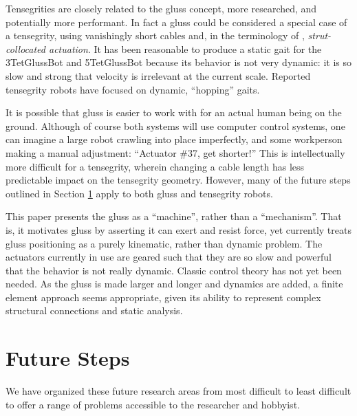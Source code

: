 \documentclass[11pt]{article}
\begin{document}
Tensegrities are closely related to the gluss concept, more researched, and potentially more performant.
In fact a gluss could be considered a special case of a tensegrity, using vanishingly short cables
and, in the terminology of \cite{paul2006}, \emph{strut-collocated actuation}.
It has been reasonable to produce a static gait for the 3TetGlussBot and 5TetGlussBot because its behavior is not
very dynamic: it is so slow and strong that velocity is irrelevant at the current scale.
Reported tensegrity robots have focused on dynamic, ``hopping'' gaits.

It is possible that gluss is easier to work with for an actual human being on the ground.
Although of course both systems will use computer control systems, one can imagine a large robot
crawling into place imperfectly, and some workperson making a manual adjustment: ``Actuator \#37, get shorter!''
This is intellectually more difficult for a tensegrity, wherein changing a cable length
has less predictable impact on the tensegrity geometry.
However, many
of the future steps outlined in Section \ref{futuresteps} apply to both gluss and tensegrity robots.

This paper presents the gluss as a ``machine'', rather than a ``mechanism''. That is, it motivates gluss
by asserting it can exert and resist force, yet currently treats gluss positioning as a purely kinematic,
rather than dynamic problem. The actuators currently in use are geared such that they are so slow
and powerful that the behavior is not really dynamic. Classic control theory has not yet been needed.
As the gluss is made larger and longer and dynamics are added,
a finite element approach\cite{géradin2001flexible} seems appropriate,
given its ability to represent complex structural connections and static analysis.



\section{Future Steps}
\label{futuresteps}

We have organized these future research areas from most difficult to least
difficult to offer a range of problems accessible to the researcher and hobbyist.
\end{document}
